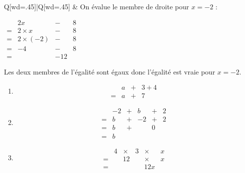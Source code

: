 \documentclass{thecours}
\begin{document}
\begin{enumerate}
\begin{tblr}{Q[wd=.45\linewidth]|Q[wd=.45\linewidth]}
                    &
                    On évalue le membre de droite pour $x=-2$ :
                    \par\vskip 10pt\hskip 30pt
                    $\begin{array}{cccc}
                        &2x&-&8\\
                        =&2\times x&-&8\\
                        =&2\times(-2)&-&8\\
                        =&-4&-&8\\
                        =&&-12&
                    \end{array}$
                \end{tblr}\vskip 10pt%
                Les deux membres de l'égalité sont égaux donc l'égalité
                est vraie pour $x=-2$.
            \end{enumerate}
        \newpage
        \vskip5pt\par{}\vskip5pt\par\noindent
            \begin{enumerate}
                \item$$\begin{array}{cccc}
                    &a&+&3+4\\
                    =&a&+&7
                \end{array}$$
                \item$$\begin{array}{cccccc}
                    &-2&+&b&+&2\\
                    =&b&+&-2&+&2\\
                    =&b&+&&0&\\
                    =&b&&&&
                \end{array}$$
                \item$$\begin{array}{cccccc}
                    &4&\times&3&\times&x\\
                    =&&12&&\times&x\\
                    =&&&&12x&
                \end{array}$$
            \end{enumerate}
\end{document}
